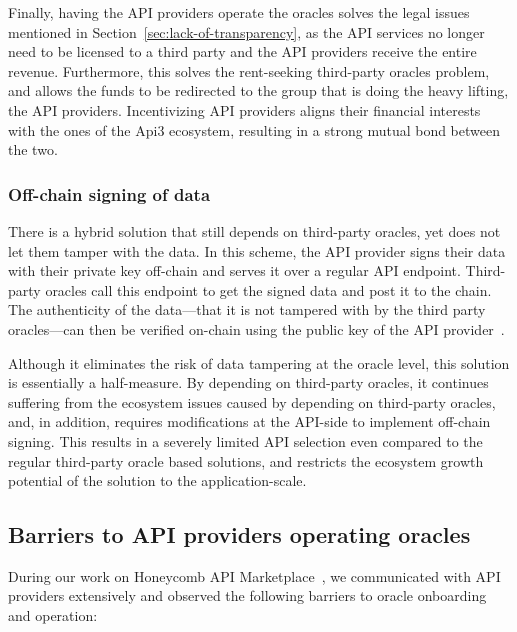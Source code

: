 \documentclass[11pt]{article}
\begin{document}
Finally, having the API providers operate the oracles solves the legal issues mentioned in Section~\ref{sec:lack-of-transparency}, as the API services no longer need to be licensed to a third party and the API providers receive the entire revenue.
Furthermore, this solves the rent-seeking third-party oracles problem, and allows the funds to be redirected to the group that is doing the heavy lifting, the API providers.
Incentivizing API providers aligns their financial interests with the ones of the Api3 ecosystem, resulting in a strong mutual bond between the two.

\subsubsection{Off-chain signing of data}
\label{sec:off-chain-signing-of-data}

There is a hybrid solution that still depends on third-party oracles, yet does not let them tamper with the data.
In this scheme, the API provider signs their data with their private key off-chain and serves it over a regular API endpoint.
Third-party oracles call this endpoint to get the signed data and post it to the chain.
The authenticity of the data---that it is not tampered with by the third party oracles---can then be verified on-chain using the public key of the API provider~\cite{open-price-feed}.

Although it eliminates the risk of data tampering at the oracle level, this solution is essentially a half-measure.
By depending on third-party oracles, it continues suffering from the ecosystem issues caused by depending on third-party oracles, and, in addition, requires modifications at the API-side to implement off-chain signing.
This results in a severely limited API selection even compared to the regular third-party oracle based solutions, and restricts the ecosystem growth potential of the solution to the application-scale.

\subsection{Barriers to API providers operating oracles}
\label{sec:barriers-to-api-providers-operating-oracles}

During our work on Honeycomb API Marketplace~\cite{benligiray:2019}, we communicated with API providers extensively and observed the following barriers to oracle onboarding and operation:
\end{document}
